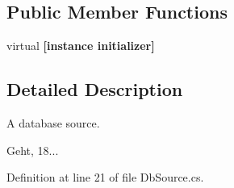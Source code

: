\subsection*{Public Member Functions}
\begin{DoxyCompactItemize}
\item 
virtual {\bfseries [instance initializer]}\label{class_editor_1_1_model_1_1_project_1_1_db_source_a242b791ad177b9babdc34d1b0b3b762c}

\end{DoxyCompactItemize}


\subsection{Detailed Description}
A database source. 

Geht, 18... 

Definition at line 21 of file Db\-Source.\-cs.

